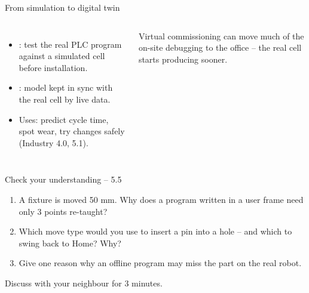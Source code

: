 \documentclass[aspectratio=169,10pt]{beamer}
\renewcommand{\hl}[1]{\text{\color{mkOrange}\bfseries #1}}
\begin{document}
\begin{frame}[t]{From simulation to digital twin}
\begin{columns}[T,onlytextwidth]
\centering
{}
\begin{itemize}\small
\item {}: test the real PLC program against a simulated cell before installation.
\item {}: model kept in sync with the real cell by live data.
\item Uses: predict cycle time, spot wear, try changes safely (Industry 4.0, 5.1).
\end{itemize}
\begin{notebox}
Virtual commissioning can move much of the on-site debugging to the office -- the real cell starts producing sooner.
\end{notebox}
\end{columns}
\end{frame}

\begin{frame}[t]{Check your understanding -- 5.5}
\vspace{4mm}
\begin{keybox}
\large
\begin{enumerate}
\item A fixture is moved 50 mm. Why does a program written in a user frame need only 3 points re-taught?\\[3mm]
\item Which move type would you use to insert a pin into a hole -- and which to swing back to Home? Why?\\[3mm]
\item Give one reason why an offline program may miss the part on the real robot.
\end{enumerate}
\end{keybox}
\vfill
\centering\small\color{mkGray} Discuss with your neighbour for 3 minutes.
\end{frame}
\end{document}
